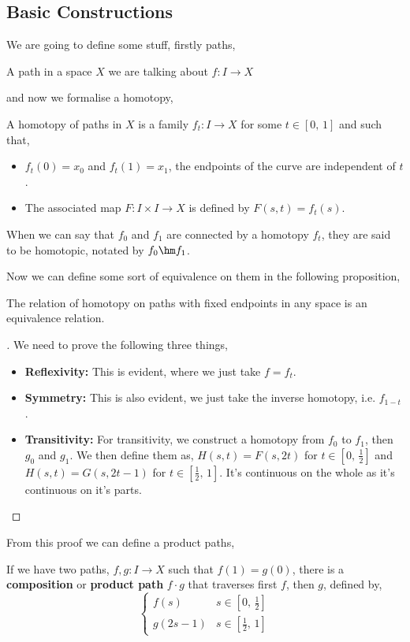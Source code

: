 \subsection{Basic Constructions}
We are going to define some stuff, firstly paths,
\begin{ndefi}[Path]
  A path in a space $X$ we are talking about $f : I \to X$
\end{ndefi}
and now we formalise a homotopy,
\begin{ndefi}
  A homotopy of paths in $X$ is a family $f_t : I \to X$ for some $t \in [0,\,1]$ and such that,
  \begin{itemize}
    \item $f_t(0) = x_0$ and $f_t(1) = x_1$, the endpoints of the curve are independent of $t$.
    \item The associated map $F : I \times I \to X$ is defined by $F(s, t) = f_t(s)$.
  \end{itemize}
  When we can say that $f_0$ and $f_1$ are connected by a homotopy $f_t$, they are said to be homotopic, notated by $f_0 \hm f_1$.
\end{ndefi}

Now we can define some sort of equivalence on them in the following proposition,
\begin{nprop}
  The relation of homotopy on paths with fixed endpoints in any space is an equivalence relation.
\end{nprop}
\begin{proof}[]
  We need to prove the following three things,
  \begin{itemize}
    \item \textbf{Reflexivity: }This is evident, where we just take $f = f_t$.
    \item \textbf{Symmetry: }This is also evident, we just take the inverse homotopy, i.e. $f_{1-t}$.
    \item \textbf{Transitivity: }For transitivity, we construct a homotopy from $f_0$ to $f_1$, then $g_0$ and $g_1$. We then define them as, $H(s, t) =F(s, 2t)$ for $t \in \left[0,\,\frac{1}{2}\right]$ and $H(s, t) = G(s, 2t-1)$ for $t \in \left[\frac{1}{2},\,1\right]$. It's continuous on the whole as it's continuous on it's parts.
  \end{itemize}
\end{proof}

From this proof we can define a product paths,
\begin{ndefi}
  If we have two paths, $f, g : I \to X$ such that $f(1) = g(0)$, there is a \textbf{composition} or \textbf{product path} $f \cdot g$ that traverses first $f$, then $g$, defined by,
  $$ \begin{cases}
    f(s) & s \in \left[0 ,\, \frac{1}{2}\right]\\
    g(2s-1) & s \in \left[\frac{1}{2},\, 1\right]
  \end{cases} $$
\end{ndefi}

